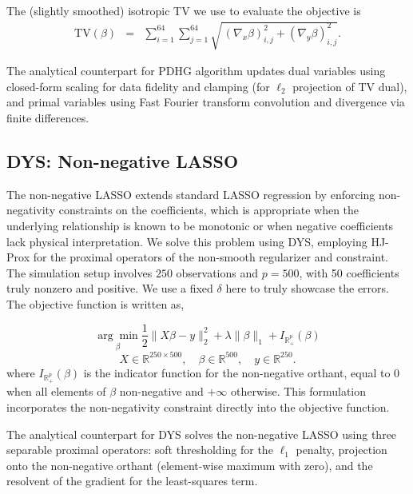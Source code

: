 \documentclass{article}
\theoremstyle{plain}
\theoremstyle{definition}
\theoremstyle{remark}
\begin{document}
The (slightly smoothed) isotropic TV we use to evaluate the objective is
\begin{eqnarray}
    \mathrm{TV}(\beta)
 & = &
\sum_{i=1}^{64}\sum_{j=1}^{64}
\sqrt{\,(\nabla_x \beta)_{i,j}^2 + (\nabla_y \beta)_{i,j}^2}.
\end{eqnarray}

The analytical counterpart for PDHG  algorithm updates dual variables using closed-form scaling for data fidelity and clamping (for $\ell_2$ projection of TV dual), and primal variables using Fast Fourier transform convolution and divergence via finite differences.

\subsection{DYS: Non-negative LASSO}
The non-negative LASSO extends standard LASSO regression by enforcing non-negativity constraints on the coefficients, which is appropriate when the underlying relationship is known to be monotonic or when negative coefficients lack physical interpretation. We solve this problem using DYS, employing HJ-Prox for the proximal operators of the non-smooth regularizer and constraint. The simulation setup involves $250$ observations and $p=500$, with 50 coefficients truly nonzero and positive. We use a fixed $\delta$ here to truly showcase the errors. The objective function is written as,

\begin{equation}
\underset{\beta}{\arg\min}
\frac{1}{2}\| X \beta - y\|_{2}^{2}
+\lambda\| \beta\|_1
+I_{\mathbb{R}_+^{p}}(\beta)
\end{equation}
\[
X \in \mathbb{R}^{250 \times 500},\quad
\beta \in\mathbb{R}^{500},\quad
y\in\mathbb{R}^{250}.
\]
where $I_{\mathbb{R}_+^{p}}(\beta)$ is the indicator function for the non-negative orthant, equal to 0 when all elements of $\beta$ non-negative and $+\infty$ otherwise. This formulation incorporates the non-negativity constraint directly into the objective function.

The analytical counterpart for DYS solves the non-negative LASSO using three separable proximal operators: soft thresholding for the $\ell_1$ penalty, projection onto the non-negative orthant (element-wise maximum with zero), and the resolvent of the gradient for the least-squares term.
\end{document}
